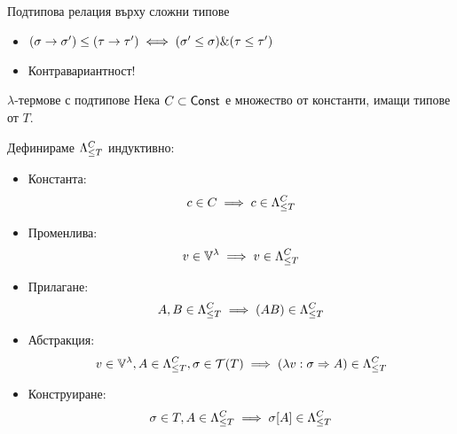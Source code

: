 \documentclass[9pt]{beamer}
\begin{document}
  \begin{frame}{Подтипова релация върху сложни типове}
    \begin{itemize}
        \item $(\sigma \tot \sigma') \less (\tau \tot \tau') \iff (\sigma' \less \sigma)
            \& (\tau \less \tau')$
        \item Контравариантност!
    \end{itemize}
  \end{frame}

  \begin{frame}{$\lambda$-термове с подтипове}
    Нека $C \subset \const$ е множество от константи, имащи типове от $T$.

    Дефинираме $\fancylambda{T}{C}$ индуктивно:
    \begin{itemize}
        \item Константа:   \[ c \in C \implies c \in \fancylambda{T}{C} \]
        \item Променлива:  \[ v \in \lvars \implies v \in \fancylambda{T}{C} \]
        \item Прилагане:   \[ A, B \in \fancylambda{T}{C} \implies (AB) \in \fancylambda{T}{C} \]
        \item Абстракция:  \[ v \in \lvars, A \in \fancylambda{T}{C}, \sigma \in \tclos{T}
                \implies (\lambda v : \sigma \abstr A) \in \fancylambda{T}{C} \]
        \item Конструиране: \[ \sigma \in T, A \in \fancylambda{T}{C}
                \implies \sigma[A] \in \fancylambda{T}{C} \]
    \end{itemize}
  \end{frame}
\end{document}
